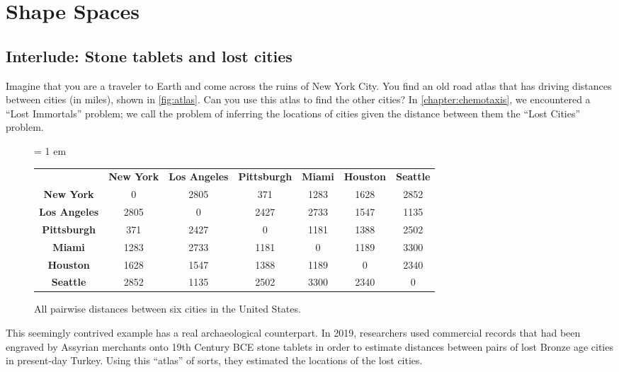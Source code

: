 \FloatBarrier
{}

\section{Shape Spaces}
\label{sec:shape_spaces}

\subsection{Interlude: Stone tablets and lost cities}

Imagine that you are a traveler to Earth and come across the ruins of New York City. You find an old road atlas that has driving distances between cities (in miles), shown in \autoref{fig:atlas}. Can you use this atlas to find the other cities? In \autoref{chapter:chemotaxis}, we encountered a ``Lost Immortals'' problem; we call the problem of inferring the locations of cities given the distance between them the ``Lost Cities'' problem.

\begin{figure}[h]
\centering
\tabcolsep = 1 em
\mySfFamily
\begin{tabular}{c c c c c c c}
& \textbf{New York} & \textbf{Los Angeles} & \textbf{Pittsburgh} & \textbf{Miami} & \textbf{Houston} & \textbf{Seattle} \\
\textbf{New York} & 0 & 2805 & 371 & 1283 & 1628 & 2852 \\
\textbf{Los Angeles} & 2805 & 0 & 2427 & 2733 & 1547 & 1135 \\
\textbf{Pittsburgh} & 371 & 2427 & 0 & 1181 & 1388 & 2502 \\
\textbf{Miami} & 1283 & 2733 & 1181 & 0 & 1189 & 3300 \\
\textbf{Houston} & 1628 & 1547 & 1388 & 1189 & 0 & 2340 \\
\textbf{Seattle} & 2852 & 1135 & 2502 & 3300 & 2340 & 0 \\
\end{tabular}
\caption{All pairwise distances between six cities in the United States.}
\label{fig:atlas}
\end{figure}

\begin{qbox}\end{qbox}

This seemingly contrived example has a real archaeological counterpart. In 2019, researchers used commercial records that had been engraved by Assyrian merchants onto 19th Century BCE stone tablets in order to estimate distances between pairs of lost Bronze age cities in present-day Turkey. Using this ``atlas'' of sorts, they estimated the locations of the lost cities.


